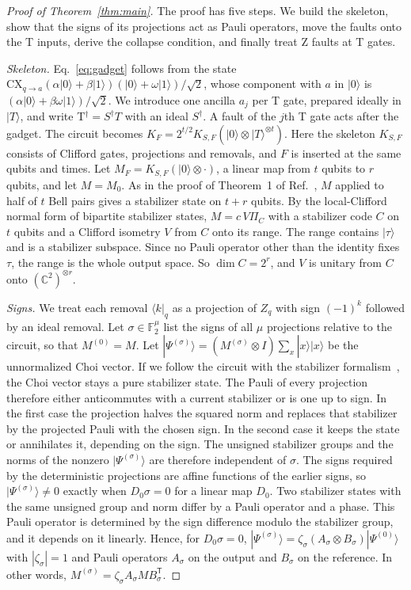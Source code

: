 \documentclass[aps,prl,reprint,twocolumn,amsmath,amssymb,floatfix,nofootinbib,superscriptaddress]{revtex4-2}
\theoremstyle{definition}
\theoremstyle{remark}
\newcommand{\F}{\mathbb F_2}
\begin{document}
\begin{proof}[Proof of Theorem~\ref{thm:main}]
The proof has five steps. We build the skeleton, show that the signs of its projections act as Pauli operators, move the faults onto the T inputs, derive the collapse condition, and finally treat Z faults at T gates.

\emph{Skeleton.} Eq.~\eqref{eq:gadget} follows from the state $\mathrm{CX}_{q\to a}(\alpha|0\rangle+\beta|1\rangle)(|0\rangle+\omega|1\rangle)/\sqrt2$, whose component with $a$ in $|0\rangle$ is $(\alpha|0\rangle+\beta\omega|1\rangle)/\sqrt2$. We introduce one ancilla $a_j$ per T gate, prepared ideally in $|T\rangle$, and write T$^\dagger=S^\dagger T$ with an ideal $S^\dagger$. A fault of the $j$th T gate acts after the gadget. The circuit becomes $K_F=2^{t/2}K_{S,F}(|0\rangle\otimes|T\rangle^{\otimes t})$. Here the skeleton $K_{S,F}$ consists of Clifford gates, projections and removals, and $F$ is inserted at the same qubits and times. Let $M_F=K_{S,F}(|0\rangle\otimes\cdot)$, a linear map from $t$ qubits to $r$ qubits, and let $M=M_0$. As in the proof of Theorem~1 of Ref.~\cite{distillationpaper}, $M$ applied to half of $t$ Bell pairs gives a stabilizer state on $t+r$ qubits. By the local-Clifford normal form of bipartite stabilizer states, $M=c\,V\Pi_C$ with a stabilizer code $C$ on $t$ qubits and a Clifford isometry $V$ from $C$ onto its range. The range contains $|\tau\rangle$ and is a stabilizer subspace. Since no Pauli operator other than the identity fixes $\tau$, the range is the whole output space. So $\dim C=2^r$, and $V$ is unitary from $C$ onto $(\mathbb C^2)^{\otimes r}$.

\emph{Signs.} We treat each removal $\langle k|_q$ as a projection of $Z_q$ with sign $(-1)^k$ followed by an ideal removal. Let $\sigma\in\F^\mu$ list the signs of all $\mu$ projections relative to the circuit, so that $M^{(0)}=M$. Let $|\Psi^{(\sigma)}\rangle=(M^{(\sigma)}\otimes I)\sum_x|x\rangle|x\rangle$ be the unnormalized Choi vector. If we follow the circuit with the stabilizer formalism~\cite{aaronsongottesman}, the Choi vector stays a pure stabilizer state. The Pauli of every projection therefore either anticommutes with a current stabilizer or is one up to sign. In the first case the projection halves the squared norm and replaces that stabilizer by the projected Pauli with the chosen sign. In the second case it keeps the state or annihilates it, depending on the sign. The unsigned stabilizer groups and the norms of the nonzero $|\Psi^{(\sigma)}\rangle$ are therefore independent of $\sigma$. The signs required by the deterministic projections are affine functions of the earlier signs, so $|\Psi^{(\sigma)}\rangle\neq0$ exactly when $D_0\sigma=0$ for a linear map $D_0$. Two stabilizer states with the same unsigned group and norm differ by a Pauli operator and a phase. This Pauli operator is determined by the sign difference modulo the stabilizer group, and it depends on it linearly. Hence, for $D_0\sigma=0$, $|\Psi^{(\sigma)}\rangle=\zeta_\sigma(A_\sigma\otimes B_\sigma)|\Psi^{(0)}\rangle$ with $|\zeta_\sigma|=1$ and Pauli operators $A_\sigma$ on the output and $B_\sigma$ on the reference. In other words, $M^{(\sigma)}=\zeta_\sigma A_\sigma MB_\sigma^{\mathsf T}$.


\end{proof}
\end{document}
